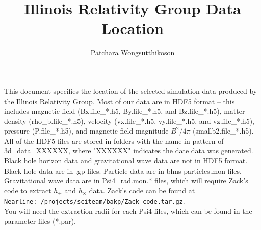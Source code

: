 \documentclass{article}
\begin{document}
\author{Patchara Wongsutthikoson}
\title{Illinois Relativity Group Data Location}
\maketitle

This document specifies the location of the selected simulation data produced by the Illinois Relativity Group. Most of our data are in HDF5 format -- this includes magnetic field (Bx.file\_*.h5, By.file\_*.h5, and Bz.file\_*.h5), matter density (rho\_b.file\_*.h5), velocity (vx.file\_*.h5, vy.file\_*.h5, and vz.file\_*.h5), pressure (P.file\_*.h5), and magnetic field magnitude $B^2/4\pi$ (smallb2.file\_*.h5). All of the HDF5 files are stored in folders with the name in pattern of 3d\_data\_XXXXXX, where "XXXXXX" indicates the date data was generated. Black hole horizon data and gravitational wave data are not in HDF5 format. Black hole data are in .gp files. Particle data are in bhns-particles.mon files. Gravitational wave data are in Psi4\_rad.mon.* files, which will require Zack's code to extract $h_+$ and $h_\times$ data. Zack's code can be found at \\ \verb|Nearline: /projects/sciteam/bakp/Zack_code.tar.gz|. \\
You will need the extraction radii for each Psi4 files, which can be found in the parameter files (*.par).






% 
% 
% 
\end{document}
